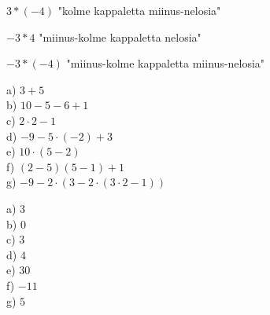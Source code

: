 $3*(-4)$ "kolme kappaletta miinus-nelosia"

$-3*4$ "miinus-kolme kappaletta nelosia"

$-3*(-4)$ "miinus-kolme kappaletta miinus-nelosia"

\begin{tehtava}
a) $3+5$ \\
b) $10-5-6+1$ \\
c) $2 \cdot 2 - 1$ \\
d) $-9 - 5 \cdot (-2) + 3$ \\
e) $10 \cdot (5 - 2)$ \\
f) $(2-5)(5 - 1) + 1$ \\
g) $-9 - 2 \cdot ( 3 - 2 \cdot (3\cdot2 - 1))$
\begin{vastaus} 
a) $3$ \\
b) $0$ \\
c) $3$ \\
d) $4$ \\
e) $30$ \\
f) $-11$ \\
g) $5$ \\
\end{vastaus}
\end{tehtava}